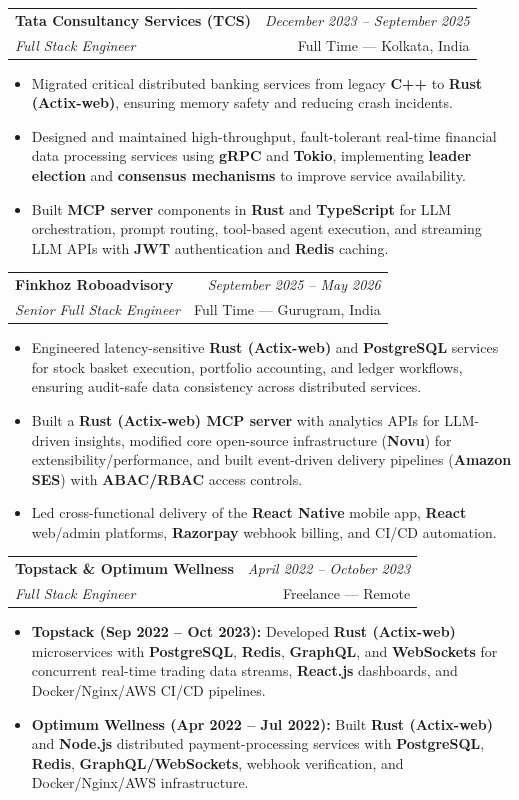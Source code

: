 \documentclass[a4paper,11pt]{article}
\makeatletter
\newcommand{\resumeSubheading}[4]{
\vspace{0.5mm}\item
    \begin{tabular*}{0.98\textwidth}[t]{l@{\extracolsep{\fill}}r}
        \textbf{#1} & \textit{\footnotesize{#4}} \\
        \textit{\footnotesize{#3}} &  \footnotesize{#2}\\
    \end{tabular*}
    \vspace{-2.4mm}
}
\newcommand{\resumeItemListStart}{\begin{itemize}[leftmargin=3ex,labelsep=1.2mm,itemsep=0.5mm]}
\newcommand{\resumeItemListEnd}{\end{itemize}\vspace{-2mm}}
\makeatother
\begin{document}
\resumeSubheading
    {Tata Consultancy Services (TCS)}{Full Time --- Kolkata, India}
    {Full Stack Engineer}{December 2023 -- September 2025}
    \resumeItemListStart
        \item Migrated critical distributed banking services from legacy \textbf{C++} to \textbf{Rust (Actix-web)}, ensuring memory safety and reducing crash incidents.
        \item Designed and maintained high-throughput, fault-tolerant real-time financial data processing services using \textbf{gRPC} and \textbf{Tokio}, implementing \textbf{leader election} and \textbf{consensus mechanisms} to improve service availability.
        \item Built \textbf{MCP server} components in \textbf{Rust} and \textbf{TypeScript} for LLM orchestration, prompt routing, tool-based agent execution, and streaming LLM APIs with \textbf{JWT} authentication and \textbf{Redis} caching.
    \resumeItemListEnd

\resumeSubheading
    {Finkhoz Roboadvisory}{Full Time --- Gurugram, India}
    {Senior Full Stack Engineer}{September 2025 -- May 2026}
    \resumeItemListStart
        \item Engineered latency-sensitive \textbf{Rust (Actix-web)} and \textbf{PostgreSQL} services for stock basket execution, portfolio accounting, and ledger workflows, ensuring audit-safe data consistency across distributed services.
        \item Built a \textbf{Rust (Actix-web) MCP server} with analytics APIs for LLM-driven insights, modified core open-source infrastructure (\textbf{Novu}) for extensibility/performance, and built event-driven delivery pipelines (\textbf{Amazon SES}) with \textbf{ABAC/RBAC} access controls.
        \item Led cross-functional delivery of the \textbf{React Native} mobile app, \textbf{React} web/admin platforms, \textbf{Razorpay} webhook billing, and CI/CD automation.
    \resumeItemListEnd

\resumeSubheading
    {Topstack \& Optimum Wellness}{Freelance --- Remote}
    {Full Stack Engineer}{April 2022 -- October 2023}
    \resumeItemListStart
        \item \textbf{Topstack (Sep 2022 -- Oct 2023):} Developed \textbf{Rust (Actix-web)} microservices with \textbf{PostgreSQL}, \textbf{Redis}, \textbf{GraphQL}, and \textbf{WebSockets} for concurrent real-time trading data streams, \textbf{React.js} dashboards, and Docker/Nginx/AWS CI/CD pipelines.
        \item \textbf{Optimum Wellness (Apr 2022 -- Jul 2022):} Built \textbf{Rust (Actix-web)} and \textbf{Node.js} distributed payment-processing services with \textbf{PostgreSQL}, \textbf{Redis}, \textbf{GraphQL/WebSockets}, webhook verification, and Docker/Nginx/AWS infrastructure.
    \resumeItemListEnd
\end{document}

